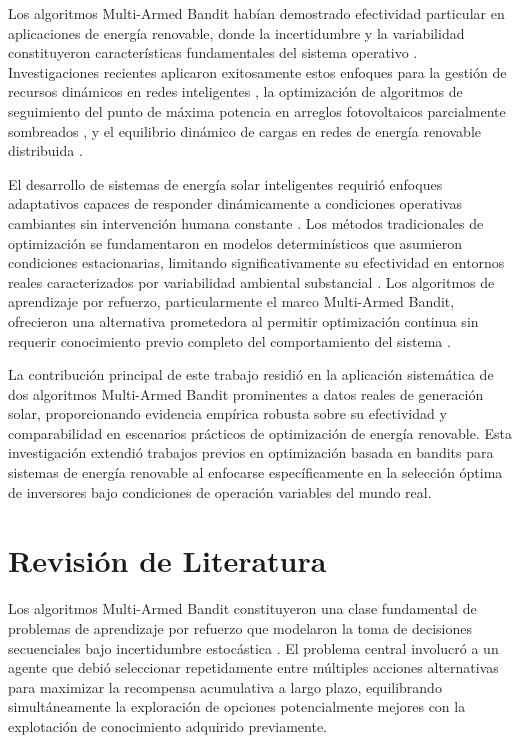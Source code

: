 \documentclass[12pt,a4paper]{article}
\begin{document}
Los algoritmos Multi-Armed Bandit habían demostrado efectividad particular en aplicaciones de energía renovable, donde la incertidumbre y la variabilidad constituyeron características fundamentales del sistema operativo \cite{zhang2022}. Investigaciones recientes aplicaron exitosamente estos enfoques para la gestión de recursos dinámicos en redes inteligentes \cite{kumar2021}, la optimización de algoritmos de seguimiento del punto de máxima potencia en arreglos fotovoltaicos parcialmente sombreados \cite{batarseh2020}, y el equilibrio dinámico de cargas en redes de energía renovable distribuida \cite{wang2022}.

El desarrollo de sistemas de energía solar inteligentes requirió enfoques adaptativos capaces de responder dinámicamente a condiciones operativas cambiantes sin intervención humana constante \cite{drury2021}. Los métodos tradicionales de optimización se fundamentaron en modelos determinísticos que asumieron condiciones estacionarias, limitando significativamente su efectividad en entornos reales caracterizados por variabilidad ambiental substancial \cite{patel2020}. Los algoritmos de aprendizaje por refuerzo, particularmente el marco Multi-Armed Bandit, ofrecieron una alternativa prometedora al permitir optimización continua sin requerir conocimiento previo completo del comportamiento del sistema \cite{srinivas2021}.

La contribución principal de este trabajo residió en la aplicación sistemática de dos algoritmos Multi-Armed Bandit prominentes a datos reales de generación solar, proporcionando evidencia empírica robusta sobre su efectividad y comparabilidad en escenarios prácticos de optimización de energía renovable. Esta investigación extendió trabajos previos en optimización basada en bandits para sistemas de energía renovable al enfocarse específicamente en la selección óptima de inversores bajo condiciones de operación variables del mundo real.

\section{Revisión de Literatura}

\justify
Los algoritmos Multi-Armed Bandit constituyeron una clase fundamental de problemas de aprendizaje por refuerzo que modelaron la toma de decisiones secuenciales bajo incertidumbre estocástica \cite{auer2002}. El problema central involucró a un agente que debió seleccionar repetidamente entre múltiples acciones alternativas para maximizar la recompensa acumulativa a largo plazo, equilibrando simultáneamente la exploración de opciones potencialmente mejores con la explotación de conocimiento adquirido previamente.
\end{document}
